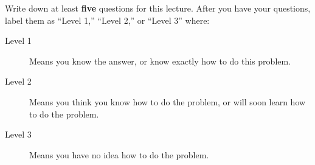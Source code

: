 \documentclass{ximera}
\begin{document}
\begin{question}
Write down at least \textbf{five} questions for this lecture. After
you have your questions, label them as ``Level 1,'' ``Level 2,'' or ``Level 3'' where:
\begin{description}
\item[Level 1] Means you know the answer, or know exactly how to do this problem.
\item[Level 2] Means you think you know how to do the problem, or will soon learn how to do the problem.
\item[Level 3] Means you have no idea how to do the problem. 
\end{description}
  \begin{freeResponse}
  \end{freeResponse}
\end{question}
\end{document}
